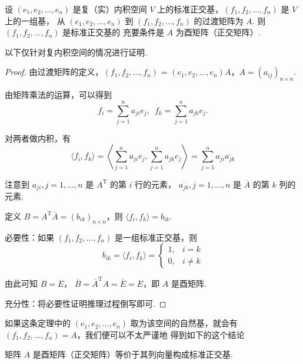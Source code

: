 \begin{theorem}
    设 $ (e_1, e_2, \ldots , e_n) $ 是复（实）内积空间 $ V $ 上的标准正交基，$ (f_1, f_2, \ldots , f_n) $ 是 $ V $ 上的一组基，
    从 $ (e_1, e_2, \ldots , e_n) $ 到 $ (f_1, f_2, \ldots , f_n) $ 的过渡矩阵为 $ A $. 则 $ (f_1, f_2, \ldots , f_n) $ 是标准正交基的
    充要条件是 $ A $ 为酉矩阵（正交矩阵）. 
\end{theorem}

以下仅针对复内积空间的情况进行证明. 

\begin{proof}
    由过渡矩阵的定义，$ (f_1, f_2, \ldots , f_n) $ = $ (e_1, e_2, \ldots , e_n)A $，$ A = (a_{ij})_{n \times n} $. 

    由矩阵乘法的运算，可以得到
    \[ f_i = \sum_{j = 1}^{n} a_{ji}e_j , \enspace f_k = \sum_{j = 1}^{n} a_{jk}e_j. \]

    对两者做内积，有
    \[
    \langle f_i, f_k \rangle = \left\langle \sum_{j = 1}^{n} a_{ji}e_j, \sum_{j = 1}^{n} a_{jk}e_j \right\rangle
    = \sum_{j = 1}^{n} a_{ji}\overline{a_{jk}} 
    \]

    注意到 $ a_{ji}, j = 1, \ldots , n $ 是 $ A^{\mathrm{T}} $ 的第 $ i $ 行的元素，
    $ \overline{a_{jk}}, j = 1, \ldots , n $ 是 $ \overline{A} $ 的第 $ k $ 列的元素.
   
    定义 $ B = A^{\mathrm{T}}\overline{A} = (b_{ik})_{n \times n} $，则 $ \langle f_i, f_k \rangle = b_{ik} $. 

    必要性：如果 $ (f_1, f_2, \ldots , f_n) $ 是一组标准正交基，则
    \[
        b_{ik} = \langle f_i, f_k \rangle = 
        \begin{cases}
            1, & i = k \\
            0, & i \neq k 
        \end{cases}    
    \]

    由此可知 $ B = E $， $ \overline{B} = \overline{A}^{\mathrm{T}} A = \overline{E} = E $，即 $ A $ 是酉矩阵. 
    
    充分性：将必要性证明推理过程倒写即可. 

\end{proof}

如果这条定理中的 $ (e_1, e_2, \ldots , e_n) $ 取为该空间的自然基，就会有 $ (f_1, f_2, \ldots , f_n) = A $，我们便可以不太严谨地
得到如下的这个结论

\begin{theorem}
    矩阵 $ A $ 是酉矩阵（正交矩阵）等价于其列向量构成标准正交基. 
\end{theorem}

